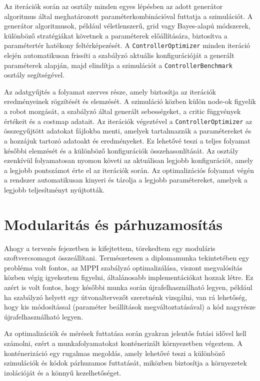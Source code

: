 Az iterációk során az osztály minden egyes lépésben az adott generátor algoritmus által meghatározott paraméterkombinációval futtatja a szimulációt. A generátor algoritmusok, például véletlenszerű, grid vagy Bayes-alapú módszerek, különböző stratégiákat követnek a paraméterek előállítására, biztosítva a paramétertér hatékony feltérképezését. A \texttt{ControllerOptimizer} minden iteráció elején automatikusan frissíti a szabályzó aktuális konfigurációját a generált paraméterek alapján, majd elindítja a szimulációt a \texttt{ControllerBenchmark} osztály segítségével. 

Az adatgyűjtés a folyamat szerves része, amely biztosítja az iterációk eredményeinek rögzítését és elemzését. A szimuláció közben külön node-ok figyelik a robot mozgását, a szabályzó által generált sebességeket, a critic függvények értékeit és a costmap adatait. Az iterációk végeztével a \texttt{ControllerOptimizer} az összegyűjtött adatokat fájlokba menti, amelyek tartalmazzák a paramétereket és a hozzájuk tartozó adatoakt és eredményeket. Ez lehetővé teszi a teljes folyamat későbbi elemzését és a különböző konfigurációk összehasonlítását. Az osztály ezenkívül folyamatosan nyomon követi az aktuálisan legjobb konfigurációt, amely a legjobb pontszámot érte el az iterációk során. Az optimalizációs folyamat végén a rendszer automatikusan kinyeri és tárolja a legjobb paramétereket, amelyek a legjobb teljesítményt nyújtották.

\section{Modularitás és párhuzamosítás}
Ahogy a tervezés fejezetben is kifejtettem, törekedtem egy moduláris szoftvercsomagot összeállítani. Természetesen a diplomamunka tekintetében egy probléma volt fontos, az MPPI szabályzó optimalizálása, viszont megvalósítás közben végig igyekeztem figyelni, általánosabb implementációkat hozzak létre. Ez azért is volt fontos, hogy későbbi munka során újrafelhasználható legyen, például ha szabályzó helyett egy útvonaltervezőt szeretnénk vizsgálni, van rá lehetőség, hogy kis módosítással (paraméter beállítások megváltoztatásával) a kód nagyrésze újrafelhasználható legyen.

Az optimalizációk és mérések futtatása során gyakran jelentős futási idővel kell számolni, ezért a munkafolyamatokat konténerizált környezetben végeztem. A konténerizáció egy rugalmas megoldás, amely lehetővé teszi a különböző szimulációk és kódok párhuzamos futtatását, miközben biztosítja a környezetek izolációját és a könnyű kezelhetőséget.

